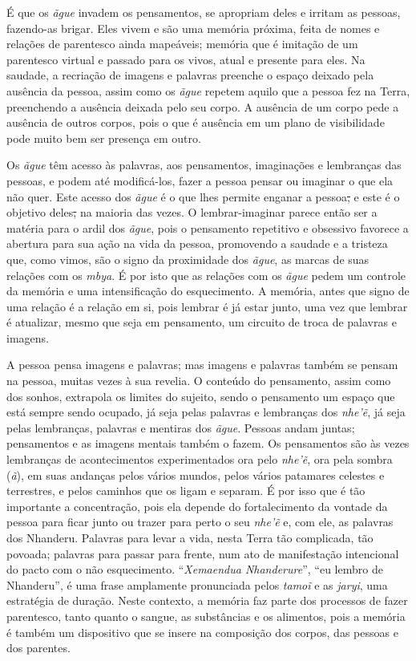 É que os \emph{ãgue} invadem os pensamentos, se apropriam deles e
irritam as pessoas, fazendo-as brigar. Eles vivem e são uma memória
próxima, feita de nomes e relações de parentesco ainda mapeáveis;
memória que é imitação de um parentesco virtual e passado para os vivos,
atual e presente para eles. Na saudade, a recriação de imagens e
palavras preenche o espaço deixado pela ausência da pessoa, assim como
os \emph{ãgue} repetem aquilo que a pessoa fez na Terra, preenchendo a
ausência deixada pelo seu corpo. A ausência de um corpo pede a ausência
de outros corpos, pois o que é ausência em um plano de visibilidade pode
muito bem ser presença em outro.

Os \emph{ãgue} têm acesso às palavras, aos pensamentos, imaginações e
lembranças das pessoas, e podem até modificá-los, fazer a pessoa pensar
ou imaginar o que ela não quer. Este acesso dos \emph{ãgue} é o que lhes
permite enganar a pessoa\sout{,} e este é o objetivo deles\sout{,} na
maioria das vezes. O lembrar-imaginar parece então ser a matéria para o
ardil dos \emph{ãgue}, pois o pensamento repetitivo e obsessivo favorece
a abertura para sua ação na vida da pessoa, promovendo a saudade e a
tristeza que, como vimos, são o signo da proximidade dos
\protect\hypertarget{OLE_LINK28}{}{\protect\hypertarget{OLE_LINK27}{}{}}\emph{ãgue},
as marcas de suas relações com os \emph{mbya}. É por isto que as
relações com os \emph{ãgue} pedem um controle da memória e uma
intensificação do esquecimento. A memória, antes que signo de uma
relação é a relação em si, pois lembrar é já estar junto, uma vez que
lembrar é atualizar, mesmo que seja em pensamento, um circuito de troca
de palavras e imagens.

A pessoa pensa imagens e palavras; mas imagens e palavras também se
pensam na pessoa, muitas vezes à sua revelia. O conteúdo do pensamento,
assim como dos sonhos, extrapola os limites do sujeito, sendo o
pensamento um espaço que está sempre sendo ocupado, já seja pelas
palavras e lembranças dos \emph{nhe'ẽ}, já seja pelas lembranças,
palavras e mentiras dos \emph{ãgue}. Pessoas andam juntas; pensamentos e
as imagens mentais também o fazem. Os pensamentos são às vezes
lembranças de acontecimentos experimentados ora pelo \emph{nhe'ẽ}, ora
pela sombra (\emph{ã}), em suas andanças pelos vários mundos, pelos
vários patamares celestes e terrestres, e pelos caminhos que os ligam e
separam. É por isso que é tão importante a concentração, pois ela
depende do fortalecimento da vontade da pessoa para ficar junto ou
trazer para perto o seu \emph{nhe'ẽ} e, com ele, as palavras dos
Nhanderu. Palavras para levar a vida, nesta Terra tão complicada, tão
povoada; palavras para passar para frente, num ato de manifestação
intencional do pacto com o não esquecimento. ``\emph{Xemaendua
Nhanderure}'', ``eu lembro de Nhanderu'', é uma frase amplamente
pronunciada pelos \emph{tamoĩ} e as \emph{jaryi}, uma estratégia de
duração. Neste contexto, a memória faz parte dos processos de fazer
parentesco, tanto quanto o sangue, as substâncias e os alimentos, pois a
memória é também um dispositivo que se insere na composição dos corpos,
das pessoas e dos parentes.

